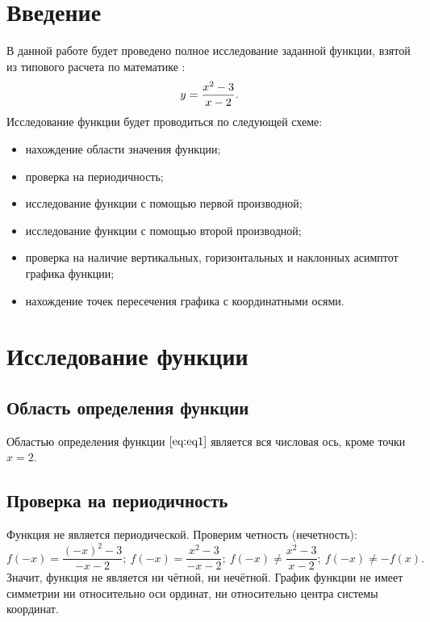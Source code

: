\section*{Введение}
В данной работе будет проведено полное исследование заданной функции, взятой из типового расчета по математике \cite{tip}: 
\begin{equation}
    \centering
    \label{eq:eq1}
    y = \frac{x^2-3}{x-2}.
\end{equation}
 Исследование функции будет проводиться по следующей схеме:
\begin{itemize}
    \item нахождение области значения функции;
    \item проверка на периодичность;
    \item исследование функции с помощью первой производной;
    \item исследование функции с помощью второй производной;
    \item проверка на наличие вертикальных, горизонтальных и наклонных асимптот графика функции;
    \item нахождение точек пересечения графика с координатными осями.
\end{itemize}
\newpage
\section{Исследование функции}
\subsection{Область определения функции}
Областью определения функции $\eqref{eq:eq1}$ является вся числовая ось, кроме точки $x = 2$.
\subsection{Проверка на периодичность}
Функция не является периодической. Проверим четность (нечетность):
\[f(-x) = \frac{(-x)^2-3}{-x-2} ;\ f(-x) = \frac{x^2-3}{-x-2} ;\ f(-x) \neq \frac{x^2-3}{x-2} ;\ f(-x) \neq -f(x).\]
Значит, функция не является ни чётной, ни нечётной. График функции не
имеет симметрии ни относительно оси ординат, ни относительно центра
системы координат.
